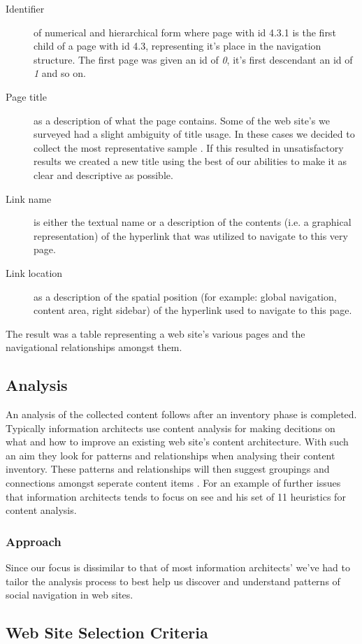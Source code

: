 \begin{description}
  \item[Identifier] of numerical and hierarchical form where page with id
    4.3.1 is the first child of a page with id 4.3, representing it's place in
    the navigation structure. The first page was given an id of \emph{0}, it's
    first descendant an id of \emph{1} and so on.
  \item[Page title] as a description of what the page contains. Some of the
    web site's we surveyed had a slight ambiguity of title usage. In these
    cases we decided to collect the most representative sample%
    \sidefill
    \sidefill
    .
    If this resulted in unsatisfactory results we created a new title using
    the best of our abilities to make it as clear and descriptive as possible.
  \item[Link name] is either the textual name or a description of the
    contents (i.e. a graphical representation) of the hyperlink that was
    utilized to navigate to this very page.
  \item[Link location] as a description of the spatial position
    (for example: global navigation, content area, right sidebar) of the
    hyperlink used to navigate to this page.
\end{description}


The result was a table representing a web site's various pages and the
navigational relationships amongst them.

\subsection{Analysis}

An analysis of the collected content follows after an inventory phase is
completed. Typically information architects use content analysis for
making decitions on what and how to improve an existing web site's content
architecture. With such an aim they look for patterns and relationships when
analysing their content inventory. These patterns and relationships will then
suggest groupings and connections amongst seperate content items
\cite[p.~243]{morville06}. For an example of further issues that information
architects tends to focus on see \citet{leise07} and his set of 11 heuristics%
for content analysis.

\subsubsection{Approach}

Since our focus is dissimilar to that of most information architects' we've
had to tailor the analysis process to best help us discover and understand
patterns of social navigation in web sites.

\subsection{Web Site Selection Criteria}


